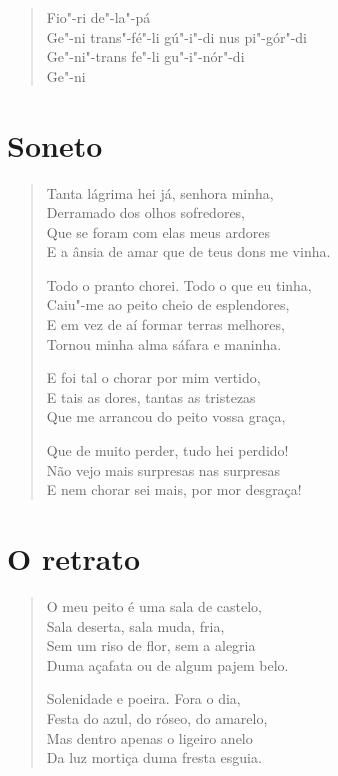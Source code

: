 {\begin{verse}
Fio"-ri de"-la"-pá\\
Ge"-ni trans"-fé"-li gú"-i"-di nus pi"-gór"-di\\
Ge"-ni"-trans fe"-li gu"-i"-nór"-di\\
Ge"-ni
\end{verse}

\chapter{Soneto}

\begin{verse}
Tanta lágrima hei já, senhora minha,\\
Derramado dos olhos sofredores,\\
Que se foram com elas meus ardores\\
E a ânsia de amar que de teus dons me vinha.

Todo o pranto chorei. Todo o que eu tinha,\\
Caiu"-me ao peito cheio de esplendores,\\
E em vez de aí formar terras melhores,\\
Tornou minha alma sáfara e maninha.

E foi tal o chorar por mim vertido,\\
E tais as dores, tantas as tristezas\\
Que me arrancou do peito vossa graça,

Que de muito perder, tudo hei perdido!\\
Não vejo mais surpresas nas surpresas\\
E nem chorar sei mais, por mor desgraça!
\end{verse}

\chapter{O retrato}

\begin{verse}
O meu peito é uma sala de castelo,\\
Sala deserta, sala muda, fria,\\
Sem um riso de flor, sem a alegria\\
Duma açafata ou de algum pajem belo.

Solenidade e poeira. Fora o dia,\\
Festa do azul, do róseo, do amarelo,\\
Mas dentro apenas o ligeiro anelo\\
Da luz mortiça duma fresta esguia.


\end{verse}}
